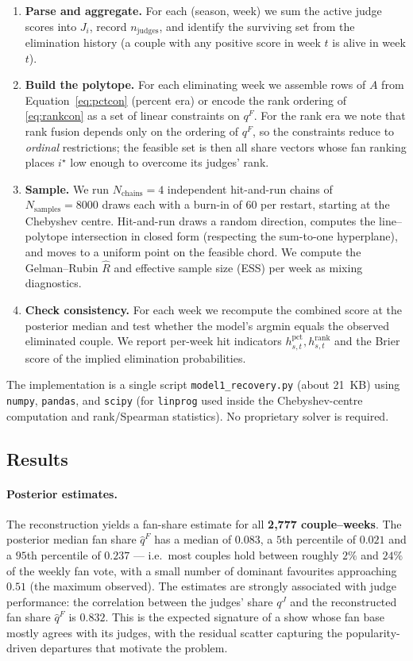 \documentclass{article}
\begin{document}
\begin{enumerate}
\item \textbf{Parse and aggregate.} For each (season, week) we sum the active judge scores
into $J_i$, record $n_{\text{judges}}$, and identify the surviving set from the
elimination history (a couple with any positive score in week $t$ is alive in week $t$).
\item \textbf{Build the polytope.} For each eliminating week we assemble rows of $A$
from Equation~\eqref{eq:pctcon} (percent era) or encode the rank ordering of
\eqref{eq:rankcon} as a set of linear constraints on $q^{F}$. For the rank era we note
that rank fusion depends only on the ordering of $q^{F}$, so the constraints reduce to
\emph{ordinal} restrictions; the feasible set is then all share vectors whose fan ranking
places $i^{\star}$ low enough to overcome its judges' rank.
\item \textbf{Sample.} We run $N_{\text{chains}}=4$ independent hit-and-run chains of
$N_{\text{samples}}=8000$ draws each with a burn-in of $60$ per restart, starting at the
Chebyshev centre. Hit-and-run draws a random direction, computes the line--polytope
intersection in closed form (respecting the sum-to-one hyperplane), and moves to a uniform
point on the feasible chord. We compute the Gelman--Rubin $\hat R$ and effective sample
size (ESS) per week as mixing diagnostics.
\item \textbf{Check consistency.} For each week we recompute the combined score at the
posterior median and test whether the model's argmin equals the observed eliminated couple.
We report per-week hit indicators $h^{\text{pct}}_{s,t}, h^{\text{rank}}_{s,t}$ and the
Brier score of the implied elimination probabilities.
\end{enumerate}

The implementation is a single script \texttt{model1\_recovery.py} (about 21~KB) using
\texttt{numpy}, \texttt{pandas}, and \texttt{scipy} (for \texttt{linprog} used inside the
Chebyshev-centre computation and rank/Spearman statistics). No proprietary solver is
required.

\subsection{Results}

\paragraph{Posterior estimates.} The reconstruction yields a fan-share estimate for all
\textbf{2{,}777 couple--weeks}. The posterior median fan share $\hat q^F$ has a median of
$0.083$, a $5$th percentile of $0.021$ and a $95$th percentile of $0.237$ --- i.e.\ most
couples hold between roughly $2\%$ and $24\%$ of the weekly fan vote, with a small number
of dominant favourites approaching $0.51$ (the maximum observed). The estimates are
strongly associated with judge performance: the correlation between the judges' share
$q^{J}$ and the reconstructed fan share $\hat q^{F}$ is $\mathbf{0.832}$. This is the
expected signature of a show whose fan base mostly agrees with its judges, with the
residual scatter capturing the popularity-driven departures that motivate the problem.
\end{document}
